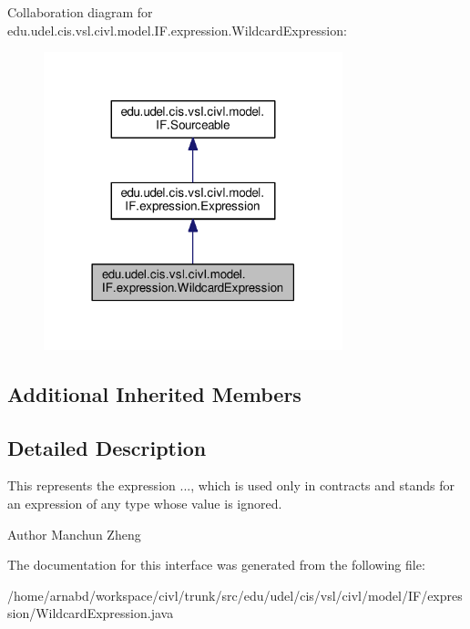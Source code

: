 Collaboration diagram for edu.\+udel.\+cis.\+vsl.\+civl.\+model.\+I\+F.\+expression.\+Wildcard\+Expression\+:
\nopagebreak
\begin{figure}[H]
\begin{center}
\leavevmode
\includegraphics[width=246pt]{interfaceedu_1_1udel_1_1cis_1_1vsl_1_1civl_1_1model_1_1IF_1_1expression_1_1WildcardExpression__coll__graph}
\end{center}
\end{figure}
\subsection*{Additional Inherited Members}


\subsection{Detailed Description}
This represents the expression {\ttfamily ...}, which is used only in contracts and stands for an expression of any type whose value is ignored. 

\begin{DoxyAuthor}{Author}
Manchun Zheng 
\end{DoxyAuthor}


The documentation for this interface was generated from the following file\+:\begin{DoxyCompactItemize}
\item 
/home/arnabd/workspace/civl/trunk/src/edu/udel/cis/vsl/civl/model/\+I\+F/expression/Wildcard\+Expression.\+java\end{DoxyCompactItemize}
